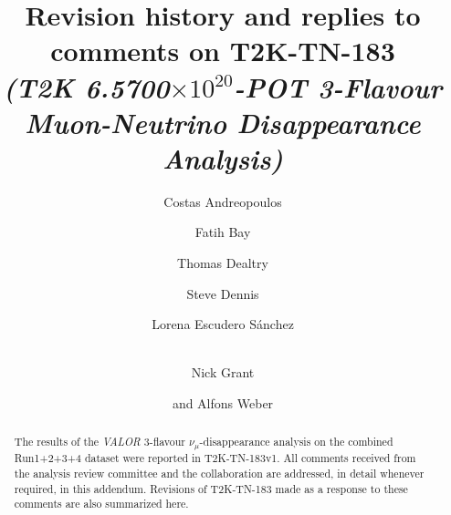 %
%

\begin{frontmatter}

\title{
  Revision history and replies to comments on T2K-TN-183\\
  {\em(T2K 6.5700$\times10^{20}$-POT 3-Flavour Muon-Neutrino Disappearance Analysis)}
}

\vspace*{0.7cm}

\author[RAL,LIV]  {Costas Andreopoulos}
\author[ETHZ]     {Fatih Bay}
\author[RAL,OXF]  {Thomas Dealtry}
\author[RAL,WAR]  {Steve Dennis}
\author[IFIC]     {Lorena Escudero S\'anchez}
\author[LANCS]    {\\Nick Grant}
\author[RAL,OXF]  {and Alfons Weber}

\address[RAL]   {Science \& Technology Facilities Council (STFC), Rutherford Appleton Laboratory,\\ Harwell Oxford Campus, OX11 0QX, UK}
\address[LIV]   {University of Liverpool, Physics Department,\\ Liverpool, L69 7ZE, UK} 
\address[ETHZ]  {ETH Zurich, Institute for Particle Physics,\\ 8092 Zurich, Switzerland}
\address[OXF]   {University of Oxford, Subdepartment of Particle Physics,\\ Oxford, OX1 3RH, UK}
\address[WAR]   {University of Warwick, Physics Department,\\ Coventry, CV4 7AL, UK}
\address[IFIC]  {CSIC and University of Valencia, Instituto de Fisica Corpuscular, \\ E-46071 Valencia, Spain}
\address[LANCS] {Lancaster University, Physics Department,\\ Lancaster, LA1 4YB, UK}

%
%

\begin{abstract}

The results of the {\em VALOR}
3-flavour $\nu_{\mu}$-disappearance analysis on the combined Run1+2+3+4 dataset 
were reported in T2K-TN-183v1.
All comments received from the analysis review committee and the collaboration
are addressed, in detail whenever required, in this addendum.
Revisions of T2K-TN-183 made as a response to these comments 
are also summarized here.

\end{abstract}

\end{frontmatter}


\tableofcontents

\clearpage



